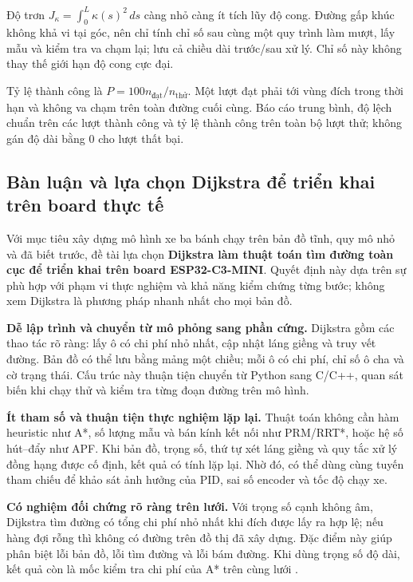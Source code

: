 Độ trơn \(J_\kappa=\int_0^L\kappa(s)^2\,ds\) càng nhỏ càng ít tích lũy độ cong. Đường gấp khúc không khả vi tại góc, nên chỉ tính chỉ số sau cùng một quy trình làm mượt, lấy mẫu và kiểm tra va chạm lại; lưu cả chiều dài trước/sau xử lý. Chỉ số này không thay thế giới hạn độ cong cực đại.

Tỷ lệ thành công là \(P=100n_{\mathrm{đạt}}/n_{\mathrm{thử}}\). Một lượt đạt phải tới vùng đích trong thời hạn và không va chạm trên toàn đường cuối cùng. Báo cáo trung bình, độ lệch chuẩn trên các lượt thành công và tỷ lệ thành công trên toàn bộ lượt thử; không gán độ dài bằng \(0\) cho lượt thất bại.

\newpage
\subsection{Bàn luận và lựa chọn Dijkstra để triển khai trên board thực tế}

Với mục tiêu xây dựng mô hình xe ba bánh chạy trên bản đồ tĩnh, quy mô nhỏ và đã biết trước, đề tài lựa chọn \textbf{Dijkstra làm thuật toán tìm đường toàn cục để triển khai trên board ESP32-C3-MINI}. Quyết định này dựa trên sự phù hợp với phạm vi thực nghiệm và khả năng kiểm chứng từng bước; không xem Dijkstra là phương pháp nhanh nhất cho mọi bản đồ.

\noindent\textbf{Dễ lập trình và chuyển từ mô phỏng sang phần cứng.} Dijkstra gồm các thao tác rõ ràng: lấy ô có chi phí nhỏ nhất, cập nhật láng giềng và truy vết đường. Bản đồ có thể lưu bằng mảng một chiều; mỗi ô có chi phí, chỉ số ô cha và cờ trạng thái. Cấu trúc này thuận tiện chuyển từ Python sang C/C++, quan sát biến khi chạy thử và kiểm tra từng đoạn đường trên mô hình.

\noindent\textbf{Ít tham số và thuận tiện thực nghiệm lặp lại.} Thuật toán không cần hàm heuristic như A*, số lượng mẫu và bán kính kết nối như PRM/RRT*, hoặc hệ số hút--đẩy như APF. Khi bản đồ, trọng số, thứ tự xét láng giềng và quy tắc xử lý đồng hạng được cố định, kết quả có tính lặp lại. Nhờ đó, có thể dùng cùng tuyến tham chiếu để khảo sát ảnh hưởng của PID, sai số encoder và tốc độ chạy xe.

\noindent\textbf{Có nghiệm đối chứng rõ ràng trên lưới.} Với trọng số cạnh không âm, Dijkstra tìm đường có tổng chi phí nhỏ nhất khi đích được lấy ra hợp lệ; nếu hàng đợi rỗng thì không có đường trên đồ thị đã xây dựng. Đặc điểm này giúp phân biệt lỗi bản đồ, lỗi tìm đường và lỗi bám đường. Khi dùng trọng số độ dài, kết quả còn là mốc kiểm tra chi phí của A* trên cùng lưới \cite{lavalle-planning-2006}.

